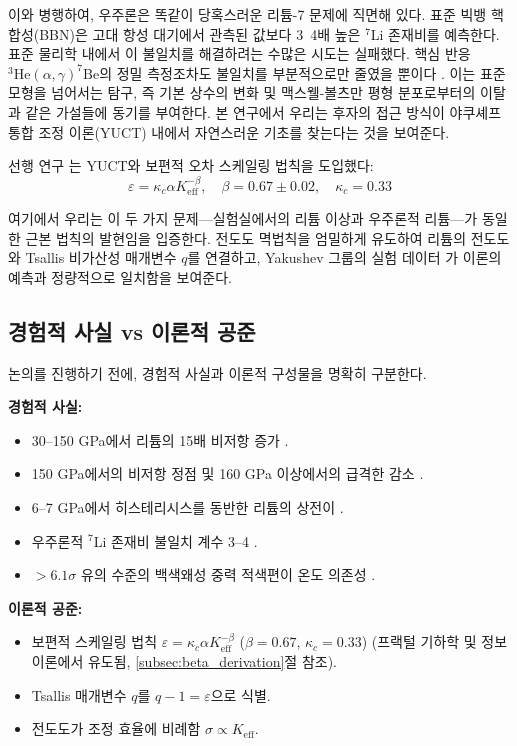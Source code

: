 \documentclass[11pt,a4paper]{article}
\newcommand{\Ke}{K_{\mathrm{eff}}}
\newcommand{\kappac}{\kappa_c}
\newcommand{\alp}{\alpha}
\theoremstyle{remark}
\begin{document}
	이와 병행하여, 우주론은 똑같이 당혹스러운 리튬-7 문제에 직면해 있다. 표준 빅뱅 핵합성(BBN)은 고대 항성 대기에서 관측된 값보다 3~4배 높은 \(^7\)Li 존재비를 예측한다. 표준 물리학 내에서 이 불일치를 해결하려는 수많은 시도는 실패했다. 핵심 반응 \(^3\mathrm{He}(\alpha,\gamma)^7\mathrm{Be}\)의 정밀 측정조차도 불일치를 부분적으로만 줄였을 뿐이다 \cite{IAEA2017}. 이는 표준 모형을 넘어서는 탐구, 즉 기본 상수의 변화 \cite{HAL2006} 및 맥스웰-볼츠만 평형 분포로부터의 이탈 \cite{bertulani2015}과 같은 가설들에 동기를 부여한다. 본 연구에서 우리는 후자의 접근 방식이 야쿠셰프 통합 조정 이론(YUCT) 내에서 자연스러운 기초를 찾는다는 것을 보여준다.
	
	선행 연구 \cite{yuct2026, appendixL, appendixC}는 YUCT와 보편적 오차 스케일링 법칙을 도입했다:
	\begin{equation}
		\varepsilon = \kappac \alp \Ke^{-\beta}, \quad \beta = 0.67 \pm 0.02, \quad \kappac = 0.33
		\label{eq:universal}
	\end{equation}
	
	여기에서 우리는 이 두 가지 문제—실험실에서의 리튬 이상과 우주론적 리튬—가 동일한 근본 법칙의 발현임을 입증한다. 전도도 멱법칙을 엄밀하게 유도하여 리튬의 전도도와 Tsallis 비가산성 매개변수 \(q\)를 연결하고, Yakushev 그룹의 실험 데이터 \cite{fortov2001, yakushev2002}가 이론의 예측과 정량적으로 일치함을 보여준다.
	
	\subsection{경험적 사실 vs 이론적 공준}
	
	논의를 진행하기 전에, 경험적 사실과 이론적 구성물을 명확히 구분한다.
	
	\textbf{경험적 사실:}
	\begin{itemize}
		\item 30–150 GPa에서 리튬의 15배 비저항 증가 \cite{fortov2001}.
		\item 150 GPa에서의 비저항 정점 및 160 GPa 이상에서의 급격한 감소 \cite{yakushev2002}.
		\item 6–7 GPa에서 히스테리시스를 동반한 리튬의 상전이 \cite{orlov2001}.
		\item 우주론적 \(^7\)Li 존재비 불일치 계수 3–4 \cite{bertulani2015}.
		\item \(>6.1\sigma\) 유의 수준의 백색왜성 중력 적색편이 온도 의존성 \cite{Crumpler2024}.
	\end{itemize}
	
	\textbf{이론적 공준:}
	\begin{itemize}
		\item 보편적 스케일링 법칙 \(\varepsilon = \kappac \alp \Ke^{-\beta}\) (\(\beta = 0.67\), \(\kappac = 0.33\)) (프랙털 기하학 및 정보 이론에서 유도됨, \ref{subsec:beta_derivation}절 참조).
		\item Tsallis 매개변수 \(q\)를 \(q-1 = \varepsilon\)으로 식별.
		\item 전도도가 조정 효율에 비례함 \(\sigma \propto \Ke\).
	\end{itemize}
	
\end{document}
